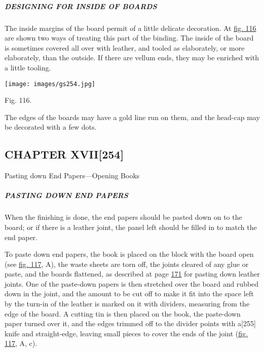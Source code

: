 \documentclass[
]{article}
\begin{document}
\hypertarget{designing-for-inside-of-boards}{%
\subparagraph{DESIGNING FOR INSIDE OF
BOARDS}\label{designing-for-inside-of-boards}}

The inside margins of the board permit of a little delicate decoration.
At \protect\hyperlink{Fig_116}{fig. 116} are shown two ways of treating
this part of the binding. The inside of the board is sometimes covered
all over with leather, and tooled as elaborately, or more elaborately,
than the outside. If there are vellum ends, they may be enriched with a
little tooling.

\protect\hypertarget{Fig_116}{}{}
\texttt{[image: images/gs254.jpg]}

Fig. 116.

The edges of the boards may have a gold line run on them, and the
head-cap may be decorated with a few dots.

\hypertarget{chapter-xvii254}{%
\subsection[CHAPTER
XVII]{\texorpdfstring{\protect\hypertarget{CHAPTER_XVII}{}{}CHAPTER
XVII{\protect\hypertarget{Page_254}{}{{[}254{]}}}}{CHAPTER XVII{[}254{]}}}\label{chapter-xvii254}}

Pasting down End Papers---Opening Books

\hypertarget{pasting-down-end-papers}{%
\subparagraph{PASTING DOWN END PAPERS}\label{pasting-down-end-papers}}

{When} the finishing is done, the end papers should be pasted down on to
the board; or if there is a leather joint, the panel left should be
filled in to match the end paper.

To paste down end papers, the book is placed on the block with the board
open (see \protect\hyperlink{Fig_117}{fig. 117}, A), the waste sheets
are torn off, the joints cleared of any glue or paste, and the boards
flattened, as described at page \protect\hyperlink{Page_171}{171} for
pasting down leather joints. One of the paste-down papers is then
stretched over the board and rubbed down in the joint, and the amount to
be cut off to make it fit into the space left by the turn-in of the
leather is marked on it with dividers, measuring from the edge of the
board. A cutting tin is then placed on the book, the paste-down paper
turned over it, and the edges trimmed off to the divider points with
a{\protect\hypertarget{Page_255}{}{{[}255{]}}} knife and straight-edge,
leaving small pieces to cover the ends of the joint
(\protect\hyperlink{Fig_117}{fig. 117}, A, c).
\end{document}
